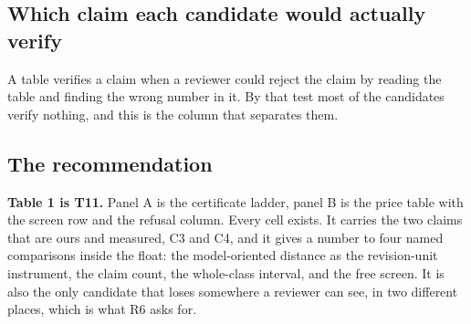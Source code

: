 \subsection{Which claim each candidate would actually verify}

A table verifies a claim when a reviewer could reject the claim by reading the table and finding
the wrong number in it. By that test most of the candidates verify nothing, and this is the column
that separates them.

\begin{center}\footnotesize
{}
\end{center}

\subsection{The recommendation}

\begin{verdict}
\textbf{Table 1 is T11.} Panel A is the certificate ladder, panel B is the price table with the
screen row and the refusal column. Every cell exists. It carries the two claims that are ours and
measured, C3 and C4, and it gives a number to four named comparisons inside the float: the
model-oriented distance as the revision-unit instrument, the claim count, the whole-class interval,
and the free screen. It is also the only candidate that loses somewhere a reviewer can see, in two
different places, which is what R6 asks for.
\end{verdict}

